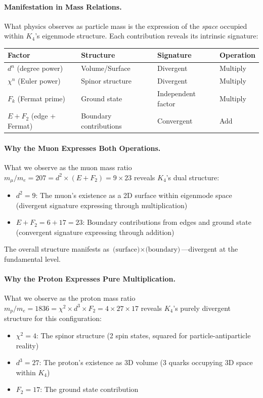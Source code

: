 \documentclass[11pt,a4paper]{book}
\begin{document}
\paragraph{Manifestation in Mass Relations.}

What physics observes as particle mass is the expression of the \emph{space} occupied within $K_4$'s eigenmode structure. Each contribution reveals its intrinsic signature:

\begin{center}
\begin{tabular}{llll}
\textbf{Factor} & \textbf{Structure} & \textbf{Signature} & \textbf{Operation} \\
\hline
$d^n$ (degree power) & Volume/Surface & Divergent & Multiply \\
$\chi^n$ (Euler power) & Spinor structure & Divergent & Multiply \\
$F_k$ (Fermat prime) & Ground state & Independent factor & Multiply \\
$E + F_2$ (edge + Fermat) & Boundary contributions & Convergent & Add \\
\end{tabular}
\end{center}

\paragraph{Why the Muon Expresses Both Operations.}

What we observe as the muon mass ratio $m_\mu / m_e = 207 = d^2 \times (E + F_2) = 9 \times 23$ reveals $K_4$'s dual structure:
\begin{itemize}
\item $d^2 = 9$: The muon's existence as a 2D surface within eigenmode space (divergent signature expressing through multiplication)
\item $E + F_2 = 6 + 17 = 23$: Boundary contributions from edges and ground state (convergent signature expressing through addition)
\end{itemize}

The overall structure manifests as $\text{(surface)} \times \text{(boundary)}$—divergent at the fundamental level.

\paragraph{Why the Proton Expresses Pure Multiplication.}

What we observe as the proton mass ratio $m_p / m_e = 1836 = \chi^2 \times d^3 \times F_2 = 4 \times 27 \times 17$ reveals $K_4$'s purely divergent structure for this configuration:
\begin{itemize}
\item $\chi^2 = 4$: The spinor structure (2 spin states, squared for particle-antiparticle reality)
\item $d^3 = 27$: The proton's existence as 3D volume (3 quarks occupying 3D space within $K_4$)
\item $F_2 = 17$: The ground state contribution
\end{itemize}
\end{document}
